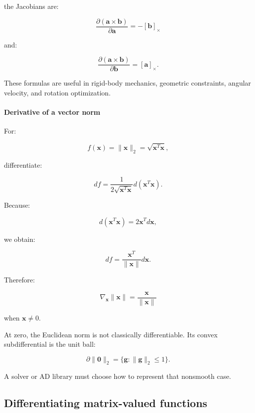 the Jacobians are:

\[
\boxed{ \frac{\partial(\mathbf a\times\mathbf b)}{\partial\mathbf a} = -[\mathbf b]_\times }
\]

and:

\[
\boxed{ \frac{\partial(\mathbf a\times\mathbf b)}{\partial\mathbf b} = [\mathbf a]_\times }.
\]

These formulas are useful in rigid-body mechanics, geometric constraints, angular velocity, and rotation optimization.

\paragraph{Derivative of a vector norm}\label{02-foundations-ii-ch027-derivative-of-a-vector-norm}

\hypertarget{02-foundations-ii-ch027-derivative-of-a-vector-norm}{}

For:

\[
f(\mathbf x)=\|\mathbf x\|_2 = \sqrt{\mathbf x^T\mathbf x},
\]

differentiate:

\[
df= \frac1{2\sqrt{\mathbf x^T\mathbf x}} d(\mathbf x^T\mathbf x).
\]

Because:

\[
d(\mathbf x^T\mathbf x)=2\mathbf x^Td\mathbf x,
\]

we obtain:

\[
df= \frac{\mathbf x^T}{\|\mathbf x\|}d\mathbf x.
\]

Therefore:

\[
\boxed{ \nabla_{\mathbf x}\|\mathbf x\| = \frac{\mathbf x}{\|\mathbf x\|} }
\]

when \(\mathbf x\ne0\).

At zero, the Euclidean norm is not classically differentiable. Its convex subdifferential is the unit ball:

\[
\partial\|\mathbf0\|_2= \{\mathbf g:\|\mathbf g\|_2\le1\}.
\]

A solver or AD library must choose how to represent that nonsmooth case.

\subsection{Differentiating matrix-valued functions}\label{02-foundations-ii-ch027-differentiating-matrix-valued-functions}

\hypertarget{02-foundations-ii-ch027-differentiating-matrix-valued-functions}{}

